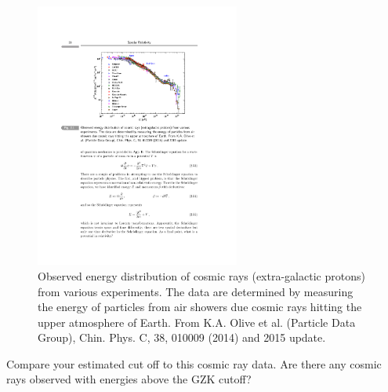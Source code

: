 \begin{figure}[h]
\centering
\includegraphics[width=0.6\textwidth]{./CosmicRays.pdf}
\caption{Observed energy distribution of cosmic rays (extra-galactic protons) from various experiments. The data are determined by measuring the energy of particles from air showers due cosmic rays hitting the upper atmosphere of Earth. From K.A. Olive et al. (Particle Data Group), Chin. Phys. C, 38, 010009 (2014) and 2015 update.}
\end{figure}


Compare your estimated cut off to this cosmic ray data. 
Are there any cosmic rays observed with energies above the GZK cutoff?


%


